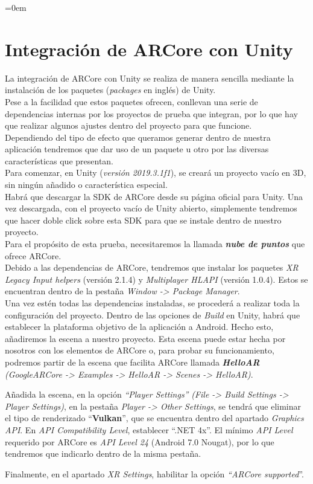 \parindent=0em
\section{Integración de ARCore con Unity}
\label{integracionARCOREUNITY}
\noindent

La integración de ARCore con Unity se realiza de manera sencilla mediante la instalación de los paquetes (\textit{packages} en inglés) de Unity.\\

Pese a la facilidad que estos paquetes ofrecen, conllevan una serie de dependencias internas por los proyectos de prueba que integran, por lo que hay que realizar algunos ajustes dentro del proyecto para que funcione.\\

Dependiendo del tipo de efecto que queramos generar dentro de nuestra aplicación tendremos que dar uso de un paquete u otro por las diversas características que presentan.\\

Para comenzar, en Unity (\textit{versión 2019.3.1f1}), se creará un proyecto vacío en 3D, sin ningún añadido o característica especial.\\

Habrá que descargar la SDK de ARCore desde su página oficial para Unity. Una vez descargada, con el proyecto vacío de Unity abierto, simplemente tendremos que hacer doble click sobre esta SDK para que se instale dentro de nuestro proyecto.\\

Para el propósito de esta prueba, necesitaremos la llamada \textit{\textbf{nube de puntos}} que ofrece ARCore.\\

Debido a las dependencias de ARCore, tendremos que instalar los paquetes \textit{XR Legacy Input helpers} (versión 2.1.4) y\textit{ Multiplayer HLAPI} (versión 1.0.4). Estos se encuentran dentro de la pestaña \textit{Window -> Package Manager}.\\

Una vez estén todas las dependencias instaladas, se procederá a realizar toda la configuración del proyecto. Dentro de las opciones de \textit{Build} en Unity, habrá que establecer la plataforma objetivo de la aplicación a Android. Hecho esto, añadiremos la escena a nuestro proyecto. Esta escena puede estar hecha por nosotros con los elementos de ARCore o, para probar su funcionamiento, podremos partir de la escena que facilita ARCore llamada \textbf{\textit{HelloAR}} \textit{(GoogleARCore -> Examples -> HelloAR -> Scenes -> HelloAR)}.

Añadida la escena, en la opción \textit{``Player Settings''} \textit{(File -> Build Settings -> Player Settings)}, en la pestaña \textit{Player -> Other Settings}, se tendrá que eliminar el tipo de renderizado ``\textbf{Vulkan}'', que se encuentra dentro del apartado \textit{Graphics API}. En \textit{API Compatibility Level}, establecer ``.NET 4x''. El mínimo \textit{API Level} requerido por ARCore es \textit{API Level 24} (Android 7.0 Nougat), por lo que tendremos que indicarlo dentro de la misma pestaña.

Finalmente, en el apartado \textit{XR Settings}, habilitar la opción \textit{``ARCore supported}''.
